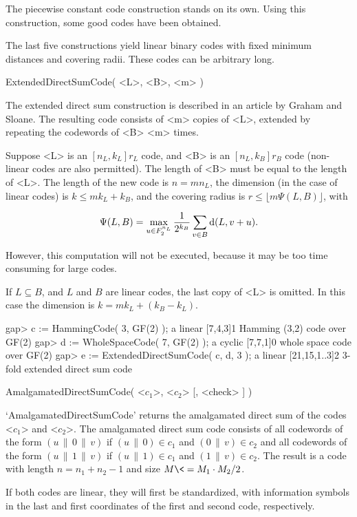 The piecewise constant code construction stands on its  own.  Using  this
construction, some good codes have been obtained.

The last five constructions yield linear binary codes with fixed  minimum
distances and covering radii. These codes can be arbitrary long.

\>ExtendedDirectSumCode( <L>, <B>, <m> )

The extended direct sum construction is described in an article by Graham
and Sloane. The resulting code consists of <m> copies of <L>, extended by
repeating the codewords of <B> <m> times.

Suppose <L> is an $[n_L, k_L]r_L$ code, and <B>  is  an  $[n_L,  k_B]r_B$
code (non-linear codes are also permitted). The length  of  <B>  must  be
equal to the length of <L>. The length of the new code is $n  =  m  n_L$,
the dimension (in the case of linear codes) is $k \leq m k_L + k_B$,  and
the covering radius is $r \leq \lfloor m \Psi( L, B ) \rfloor$, with

$$
\Psi( L, B ) = \max_{u \in F_2^{n_L}} \frac{1}{2^{k_B}}
               \sum_{v \in B} {\rm d}( L, v + u ).
$$

However, this computation will not be executed, because  it  may  be  too
time consuming for large codes.

If $ L \subseteq B $, and $L$ and $B$ are linear codes, the last copy  of
<L> is omitted. In this case the dimension is $k = m k_L + (k_B  -  k_L)$.

\beginexample
gap> c := HammingCode( 3, GF(2) );
a linear [7,4,3]1 Hamming (3,2) code over GF(2)
gap> d := WholeSpaceCode( 7, GF(2) );
a cyclic [7,7,1]0 whole space code over GF(2)
gap> e := ExtendedDirectSumCode( c, d, 3 );
a linear [21,15,1..3]2 3-fold extended direct sum code
\endexample

\>AmalgamatedDirectSumCode( <$c_1$>, <$c_2$> [, <check> ] )

`AmalgamatedDirectSumCode' returns the amalgamated direct sum  of  the  codes
<$c_1$> and <$c_2$>. The  amalgamated  direct  sum  code  consists  of  all
codewords of the form
$(u \, \| \,0 \, \| \, v)$
if
$(u \, \| \, 0) \in c_1$
and
$(0 \, \| \, v) \in c_2$
and all codewords of the form
$(u \, \| \, 1 \, \| \, v)$
if
$(u \, \| \, 1) \in c_1$
and
$(1 \, \| \, v) \in c_2$.
The result is a code with length
$ n = n_1 + n_2 - 1 $
and size
$ M \<= M_1 \cdot M_2 / 2 $.

If  both  codes  are  linear,  they  will  first  be  standardized,  with
information symbols in the last and first coordinates of  the  first  and
second code, respectively.

